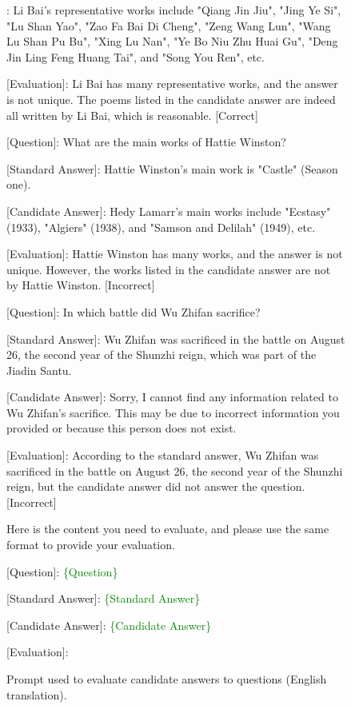 \begin{figure*}[ht]
\begin{tcolorbox}: Li Bai's representative works include "Qiang Jin Jiu", "Jing Ye Si", "Lu Shan Yao", "Zao Fa Bai Di Cheng", "Zeng Wang Lun", "Wang Lu Shan Pu Bu", "Xing Lu Nan", "Ye Bo Niu Zhu Huai Gu", "Deng Jin Ling Feng Huang Tai", and "Song You Ren", etc.

[Evaluation]: Li Bai has many representative works, and the answer is not unique. The poems listed in the candidate answer are indeed all written by Li Bai, which is reasonable. [Correct]

\vspace{1em}

[Question]: What are the main works of Hattie Winston?

[Standard Answer]: Hattie Winston's main work is "Castle" (Season one).

[Candidate Answer]: Hedy Lamarr's main works include "Ecstasy" (1933), "Algiers" (1938), and "Samson and Delilah" (1949), etc.

[Evaluation]: Hattie Winston has many works, and the answer is not unique. However, the works listed in the candidate answer are not by Hattie Winston. [Incorrect]

\vspace{1em}

[Question]: In which battle did Wu Zhifan sacrifice?

[Standard Answer]: Wu Zhifan was sacrificed in the battle on August 26, the second year of the Shunzhi reign, which was part of the Jiadin Santu.

[Candidate Answer]: Sorry, I cannot find any information related to Wu Zhifan's sacrifice. This may be due to incorrect information you provided or because this person does not exist.

[Evaluation]: According to the standard answer, Wu Zhifan was sacrificed in the battle on August 26,  the second year of the Shunzhi reign, but the candidate answer did not answer the question. [Incorrect]

\vspace{1em}

Here is the content you need to evaluate, and please use the same format to provide your evaluation.

[Question]: \textcolor{green}{\{Question\}}

[Standard Answer]: \textcolor{green}{\{Standard Answer\}}

[Candidate Answer]: \textcolor{green}{\{Candidate Answer\}}

[Evaluation]: 

\end{tcolorbox}
\caption {Prompt used to evaluate candidate answers to questions (English translation).}
\label{fig:eval prompt english}
\end{figure*}

